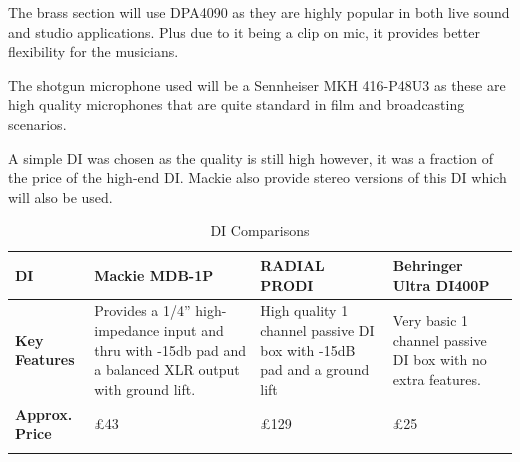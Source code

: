                 The brass section will use DPA4090 as they are highly popular in both live sound and studio applications. Plus due to it being a clip on mic, it provides better flexibility for the musicians.

                The shotgun microphone used will be a Sennheiser MKH 416-P48U3 as these are high quality microphones that are quite standard in film and broadcasting scenarios.

                A simple DI was chosen as the quality is still high however, it was a fraction of the price of the high-end DI. Mackie also provide stereo versions of this DI which will also be used.

                \begin{longtable}[H]{|p{1.5cm}|p{4.8cm}|p{4.8cm}|p{4.8cm}|}
                \hline
                \textbf{DI} &
                  \cellcolor[HTML]{9AFF99}\textbf{Mackie MDB-1P} &
                  \cellcolor[HTML]{FFCCC9}\textbf{RADIAL PRODI} &
                  \cellcolor[HTML]{FFCCC9}\textbf{Behringer Ultra DI400P} \\ \hline
                \endfirsthead
                \endhead
                \textbf{Key Features} &
                  \cellcolor[HTML]{9AFF99}Provides a 1/4” high-impedance input and thru with -15db pad and a balanced XLR output with ground lift. &
                  \cellcolor[HTML]{FFCCC9}High quality 1 channel passive DI box with -15dB pad and a ground lift &
                  \cellcolor[HTML]{FFCCC9}Very basic 1 channel passive DI box with no extra features. \\ \hline
                \textbf{Approx. Price} &
                  £43 &
                  £129 &
                  £25 \\ \hline
                  \caption{DI Comparisons}
                    \label{tab:di_comparisons}
                \end{longtable}

